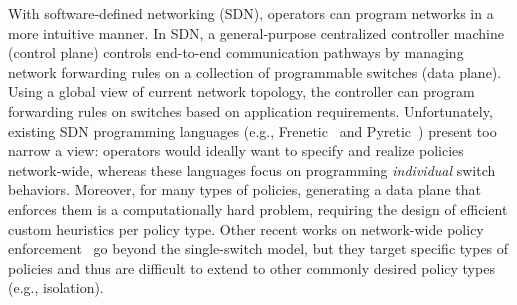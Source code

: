 

With software-defined networking (SDN),
operators can program networks in a more intuitive manner. In SDN, a
general-purpose centralized controller machine (control plane)
controls end-to-end communication pathways by managing network
forwarding rules on a collection of programmable switches (data
plane). Using a global view of current network topology, the
controller can program forwarding rules on switches based on
application requirements.
Unfortunately, existing SDN programming languages (e.g.,
Frenetic~\cite{frenetic} and Pyretic~\cite{pyretic}) present too
narrow a view: operators would ideally want to specify and realize
policies network-wide, whereas these languages focus on
programming {\em individual} switch behaviors.  Moreover, for many
types of policies, generating a data plane that enforces them is a
computationally hard problem, requiring the design of efficient custom
heuristics  per policy type. Other recent works on
network-wide policy enforcement~\cite{merlin,simple} go beyond the
single-switch model, but they target specific types of policies and
thus are difficult to extend to other commonly desired policy types
(e.g., isolation).







